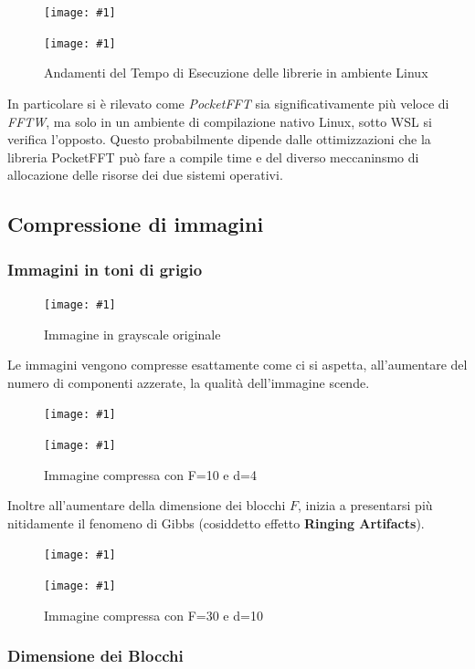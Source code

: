 \documentclass[a4paper,11pt,oneside, table]{article}
\newcommand{\putimage}[4] {
	\begin{figure}[H]
	    \centering
	    \texttt{[image: \#1]}
	    \caption{#2}\label{#3}
	\end{figure}
}
\newcommand{\putsubimage}[5] {
  \begin{minipage}{{#4}\linewidth}
	    \centering
      \texttt{[image: \#1]}
	    \caption{#2}\label{#3}
	\end{minipage}
}
\newcommand{\putimagecouple}[2] {
  \begin{figure}[!htb]
      \centering
      #1
      \hspace{0.5cm}
      #2
  \end{figure}
}
\begin{document}
\putimagecouple
  {\putsubimage{./images/benchmark-libraries-wsl.png}{Andamenti del Tempo di Esecuzione delle librerie in ambiente WSL}{png:benchmark-libraries-wsl}{0.45}{0.99}}
  {\putsubimage{./images/benchmark-libraries-linux.png}{Andamenti del Tempo di Esecuzione delle librerie in ambiente Linux}{png:benchmark-libraries-linux}{0.45}{0.99}}

In particolare si \`e rilevato come \textit{PocketFFT} sia significativamente pi\`u veloce di \textit{FFTW}, ma solo in un ambiente di compilazione nativo Linux, sotto WSL si verifica l'opposto.
Questo probabilmente dipende dalle ottimizzazioni che la libreria PocketFFT pu\`o fare a compile time e del diverso meccaninsmo di allocazione delle risorse dei due sistemi operativi.
\subsection{Compressione di immagini}

\subsubsection{Immagini in toni di grigio}

\putimage{./images/compression-gs-original.png}{Immagine in grayscale originale}{png:compression-gs-original}{0.45}

Le immagini vengono compresse esattamente come ci si aspetta, all'aumentare del numero di componenti azzerate, la qualit\`a dell'immagine scende.

\putimagecouple
  {\putsubimage{./images/compression-gs-F10-d16.png}{Immagine compressa con F=10 e d=16}{png:compression-gs-F10-d16}{0.45}{0.99}}
  {\putsubimage{./images/compression-gs-F10-d4.png}{Immagine compressa con F=10 e d=4}{png:compression-gs-F10-d4}{0.45}{0.99}}

Inoltre all'aumentare della dimensione dei blocchi $F$, inizia a presentarsi pi\`u nitidamente il fenomeno di Gibbs (cosiddetto effetto \textbf{Ringing Artifacts}).

\putimagecouple
  {\putsubimage{./images/compression-gs-F30-d50.png}{Immagine compressa con F=30 e d=50}{png:compression-gs-F30-d50}{0.45}{0.99}}
  {\putsubimage{./images/compression-gs-F30-d10.png}{Immagine compressa con F=30 e d=10}{png:compression-gs-F30-d10}{0.45}{0.99}}

\newpage

\subsubsection{Dimensione dei Blocchi}
\end{document}
